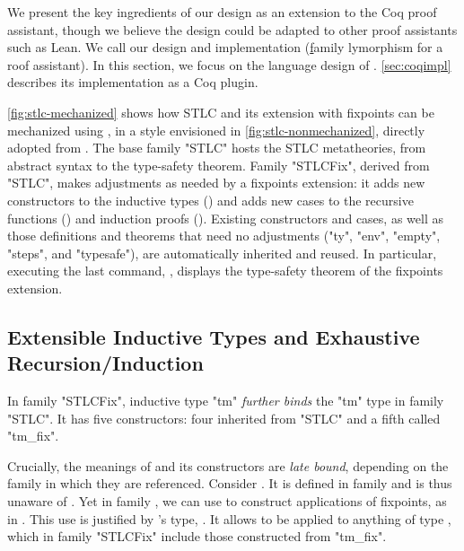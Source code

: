We present the key ingredients of our design as an extension to the Coq
proof assistant,
though we believe the design could be adapted to other proof assistants such as Lean.
We call our design and implementation \Lang (\underline{f}amily
\underline{}lymorphism for a \underline{}roof assistant).
In this section, we focus on the language design of \Lang.
\cref{sec:coqimpl} describes its implementation as a Coq plugin.



\cref{fig:stlc-mechanized} shows how STLC and its extension with
fixpoints can be mechanized using \Lang, in a style envisioned in
\cref{fig:stlc-nonmechanized}, directly adopted from \citet{sf-pl}. %
The base family "STLC" hosts the STLC metatheories, from abstract syntax
to the type-safety theorem.
Family "STLCFix", derived from "STLC", makes adjustments as needed by a fixpoints extension:
it adds new constructors to the inductive types () and
adds new cases to the recursive functions () and
induction proofs ().
Existing constructors and cases, as well as those definitions and
theorems that need no adjustments ("ty", "env", "empty", "steps", and
"typesafe"), are automatically inherited and reused.
In particular, executing the last command, ,
displays the type-safety theorem of the fixpoints extension.

\subsection{Extensible Inductive Types and Exhaustive Recursion/Induction}


In family "STLCFix", inductive type "tm" \emph{further binds} the "tm" type
in family "STLC". It has five constructors: four inherited from
"STLC" and a fifth called "tm_fix".

Crucially, the meanings of  and its constructors are
\emph{late bound}, depending on the family in which they are referenced.
Consider .
It is defined in family  and is thus unaware of .
Yet in family , we can use  to construct
applications of fixpoints, as in
.
This use is justified by 's type,
.
It allows  to be applied to anything of type ,
which in family "STLCFix" include those constructed from "tm_fix".


